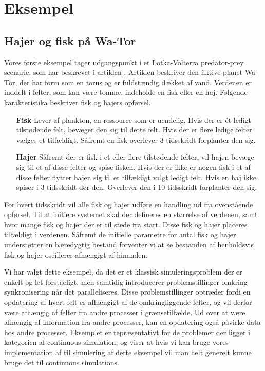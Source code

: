 \section{Eksempel}\label{sec:des-examples}


\subsection{Hajer og fisk på Wa-Tor} 
Vores første eksempel tager  udgangspunkt i et Lotka-Volterra predator-prey scenarie, som \citeauthor{wator}
har beskrevet i artiklen \cite{wator}. Artiklen beskriver den
fiktive planet Wa-Tor, der har form som en torus og er fuldstændig
dækket af vand. Verdenen er inddelt i felter, som kan være tomme, indeholde en
fisk eller en haj\cite[20]{wator}. Følgende karakteristika beskriver fisk og hajers
opførsel.

\begin{itemize}
\item[\textbf{Fisk}]
Lever af plankton, en ressource som er uendelig. Hvis der er ét ledigt 
tilstødende felt, bevæger den sig til dette felt. Hvis der er flere ledige 
felter vælges et tilfældigt. Såfremt en fisk overlever 3 tidsskridt forplanter 
den sig.
\item[\textbf{Hajer}]
Såfremt der er fisk i et eller flere tilstødende felter, vil hajen bevæge sig 
til et af disse felter og spise fisken. Hvis der er ikke er nogen fisk i et af 
disse felter flytter hajen sig til et tilfældigt valgt ledigt felt. Hvis en haj 
ikke spiser i 3 tidsskridt dør den. Overlever den i 10 tidsskridt forplanter 
den sig.
\end{itemize}

For hvert tidsskridt vil alle fisk og hajer udføre en handling ud fra
ovenstående opførsel.
Til at initiere systemet skal der defineres en størrelse af verdenen,
samt hvor mange fisk og hajer der er til stede fra start. Disse fisk og
hajer placeres tilfældigt i verdenen.
Såfremt de initielle parametre for antal fisk og hajer understøtter en 
bæredygtig bestand forventer vi at se bestanden af henholdsvis fisk og hajer 
oscillerer afhængigt af hinanden.

Vi har valgt dette eksempel, da det er et klassisk simuleringsproblem der er enkelt og let forståeligt, men samtidig 
introducerer problemstillinger omkring synkronisering når det paralleliseres.  
Disse problemstillinger optræder fordi en opdatering af hvert felt er afhængigt 
af de omkringliggende felter, og vil derfor være afhængig af felter fra andre 
processer i grænsetilfælde. Ud over at være afhængig af information fra andre 
processer, kan en opdatering også påvirke data hos andre processer. Eksemplet er repræsentativt for de problemer der ligger i kategorien af continuous simulation, og viser at hvis vi kan bruge vores implementation af \des til simulering af dette eksempel vil man helt generelt kunne bruge det til continuous simulations.


